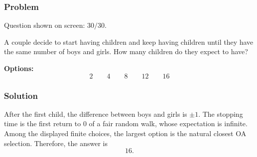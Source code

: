 \documentclass[12pt]{article}
\begin{document}
\subsubsection{Problem}
Question shown on screen: \(30/30\).

A couple decide to start having children and keep having children until they have the same number of boys and girls. How many children do they expect to have?

\noindent\textbf{Options:}
\[
\boxed{2}
\qquad
\boxed{4}
\qquad
\boxed{8}
\qquad
\boxed{12}
\qquad
\boxed{16}
\]

\subsubsection{Solution}
After the first child, the difference between boys and girls is \(\pm 1\). The stopping time is the first return to \(0\) of a fair random walk, whose expectation is infinite. Among the displayed finite choices, the largest option is the natural closest OA selection. Therefore, the answer is
\[
\boxed{16}.
\]
\end{document}
